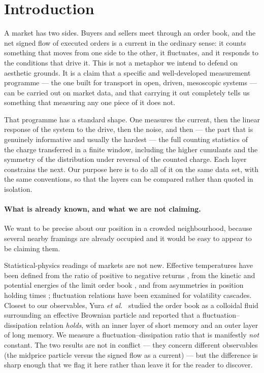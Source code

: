 \documentclass[aps,pre,twocolumn,superscriptaddress,floatfix,nofootinbib]{revtex4-2}
\begin{document}
\maketitle

\section{Introduction}

A market has two sides. Buyers and sellers meet through an order book, and the
net signed flow of executed orders is a current in the ordinary sense: it counts
something that moves from one side to the other, it fluctuates, and it responds
to the conditions that drive it. This is not a metaphor we intend to defend on
aesthetic grounds. It is a claim that a specific and well-developed measurement
programme --- the one built for transport in open, driven, mesoscopic systems ---
can be carried out on market data, and that carrying it out completely tells us
something that measuring any one piece of it does not.

That programme has a standard shape. One measures the current, then the linear
response of the system to the drive, then the noise, and then --- the part that
is genuinely informative and usually the hardest --- the full counting
statistics of the charge transferred in a finite window, including the higher
cumulants and the symmetry of the distribution under reversal of the counted
charge. Each layer constrains the next. Our purpose here is to do all of it on
the same data set, with the same conventions, so that the layers can be
compared rather than quoted in isolation.

\paragraph*{What is already known, and what we are not claiming.}
We want to be precise about our position in a crowded neighbourhood, because
several nearby framings are already occupied and it would be easy to appear to
be claiming them.

Statistical-physics readings of markets are not new. Effective temperatures
have been defined from the ratio of positive to negative returns
\cite{ramezani2025}, from the kinetic and potential energies of the limit order
book \cite{li2024entropy}, and from asymmetries in position holding times
\cite{gao2026}; fluctuation relations have been examined for volatility
cascades. Closest to our observables, Yura \textit{et al.}\ \cite{yura2014}
studied the order book as a colloidal fluid surrounding an effective Brownian
particle and reported that a fluctuation--dissipation relation \emph{holds},
with an inner layer of short memory and an outer layer of long memory. We
measure a fluctuation--dissipation ratio that is manifestly \emph{not} constant.
The two results are not in conflict --- they concern different observables (the
midprice particle versus the signed flow as a current) --- but the difference is
sharp enough that we flag it here rather than leave it for the reader to
discover.
\end{document}
